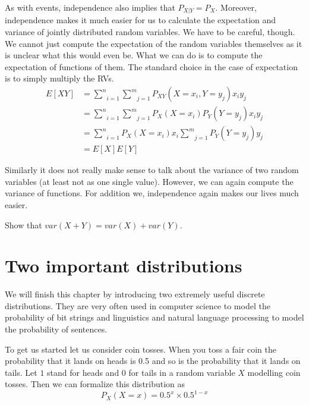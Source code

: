 \documentclass[a4paper,11pt,leqno]{report}
\begin{document}
As with events, independence also implies that $ P_{X|Y} = P_{X} $. Moreover, independence makes it much easier for us
to calculate the expectation and variance of jointly distributed random variables. We have to be careful, though. We
cannot just compute the expectation of the random variables themselves as it is unclear what this would even be.
What we can do is to compute the expectation of functions of them. The standard choice in the case of expectation
is to simply multiply the RVs.
\begin{align}
E[XY] &= \underset{i=1}{\overset{n}{\sum}}\underset{j=1}{\overset{m}{\sum}} P_{XY}(X=x_{i},Y=y_{j}) x_{i}y_{j} \\
&= \underset{i=1}{\overset{n}{\sum}}\underset{j=1}{\overset{m}{\sum}} P_{X}(X=x_{i})P_{Y}(Y=y_{j}) x_{i}y_{j} \\
&= \underset{i=1}{\overset{n}{\sum}}P_{X}(X=x_{i})x_{i} \underset{j=1}{\overset{m}{\sum}} P_{Y}(Y=y_{j}) y_{j} \\
&= E[X]E[Y]
\end{align}

Similarly it does not really make sense to talk about the variance of two random variables (at least not as one single
value). However, we can again compute the variance of functions. For addition we, independence again makes our lives
much easier.

\begin{Exercise}
Show that $ var(X + Y) = var(X) + var(Y) $.
\end{Exercise}



\section{Two important distributions}

We will finish this chapter by introducing two extremely useful discrete distributions. They are very often used in
computer science to model the probability of bit strings and linguistics and natural language processing to model
the probability of sentences. 

To get us started let us consider coin tosses. When you toss a fair coin the probability that it lands on heads is 0.5 and
so is the probability that it lands on tails. Let $ 1 $ stand for heads and $ 0 $ for tails in a random variable $ X $ 
modelling coin tosses. Then we can formalize this distribution as
\begin{equation}
P_{X}(X=x) = 0.5^{x}\times 0.5^{1-x}
\end{equation}
\end{document}

